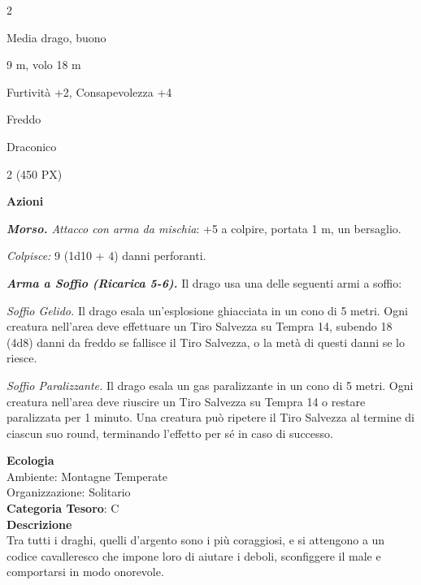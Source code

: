 \begin{multicols}{2}
{
\begin{description}[noitemsep, topsep=0pt, parsep=0pt, partopsep=0pt, itemsep=1pt, leftmargin=2.35cm,  labelwidth=2.2cm, itemindent=0cm, listparindent=0pt] %
\setlength{\baselineskip}{10pt}
\item[\textbf{Taglia/Tipo}] Media drago, buono
\item[\textbf{Caratt.}] 
\item[\textbf{Punti Ferita}] 
\item[\textbf{Movimento}] 9 m, volo 18 m
\item[\textbf{Tiri Salvez.}] 
\item[\textbf{Comp.}] Furtività +2, Consapevolezza +4
\item[\textbf{Imm. Danni}] Freddo
\item[\textbf{Sensi}] 
\item[\textbf{Linguaggi}] Draconico
\item[\textbf{Sfida}] 2 (450 PX)
\end{description}
\smallskip

\textbf{Azioni}

\emph{\textbf{Morso.} Attacco con arma da mischia}: +5 a colpire, portata 1 m, un bersaglio.

\emph{Colpisce:} 9 (1d10 + 4) danni perforanti.

\emph{\textbf{Arma a Soffio (Ricarica 5-6).}} Il drago usa una delle seguenti armi a soffio:

\emph{Soffio Gelido.} Il drago esala un'esplosione ghiacciata in un cono di 5 metri. Ogni creatura nell'area deve effettuare un Tiro Salvezza su Tempra 14, subendo 18 (4d8) danni da freddo se fallisce il Tiro Salvezza, o la metà di questi danni se lo riesce.

\emph{Soffio Paralizzante.} Il drago esala un gas paralizzante in un cono di 5 metri. Ogni creatura nell'area deve riuscire un Tiro Salvezza su Tempra 14 o restare paralizzata per 1 minuto. Una creatura può ripetere il Tiro Salvezza al termine di ciascun suo round, terminando l'effetto per sé in caso di successo.

\textbf{Ecologia}\\
Ambiente: Montagne Temperate\\
Organizzazione: Solitario\\
\textbf{Categoria Tesoro}: C\\
\textbf{Descrizione}\\
Tra tutti i draghi, quelli d'argento sono i più coraggiosi, e si attengono a un codice cavalleresco che impone loro di aiutare i deboli, sconfiggere il male e comportarsi in modo onorevole.



}
\end{multicols}
